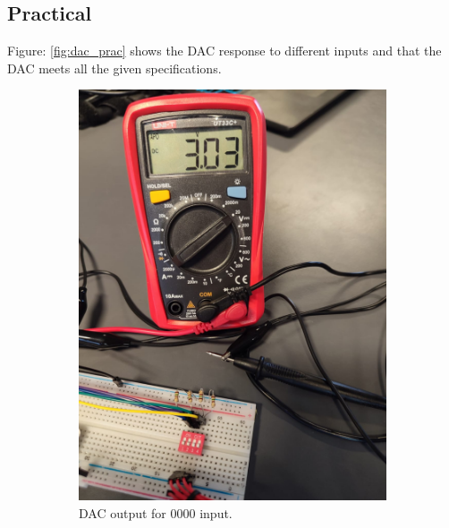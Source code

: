 \subsection{Practical}
Figure: \ref{fig:dac_prac} shows the DAC response to different inputs and that the DAC meets all the given specifications.
\begin{figure}[H]
\centering
\begin{subfigure}[]{0.2\textwidth}
\includegraphics[width=\linewidth]{./Figures/DAC_Prac_0000.jpeg}
\caption{DAC output for 0000 input.}
\label{subfig:dac_prac_0000}	
\end{subfigure}
\hfill
\begin{subfigure}[]{0.2\textwidth}

\end{subfigure}
\end{figure}

